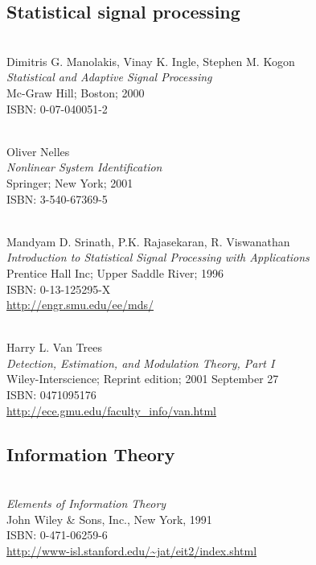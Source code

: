 \begin{thebibliography}{9}
\subsection*{Statistical signal processing}
\hspace{1pt}\\
   Dimitris G. Manolakis, Vinay K. Ingle, Stephen M. Kogon\\ 
   {\em Statistical and Adaptive Signal Processing} \\
   Mc-Graw Hill; Boston; 2000 \\
   ISBN: 0-07-040051-2 

\hspace{1pt}\\
   Oliver Nelles\\ 
   {\em Nonlinear System Identification} \\
   Springer; New York; 2001 \\
   ISBN: 3-540-67369-5 

\hspace{1pt}\\
   Mandyam D. Srinath, P.K. Rajasekaran, R. Viswanathan\\ 
   {\em Introduction to Statistical Signal Processing with Applications} \\
   Prentice Hall Inc; Upper Saddle River; 1996 \\
   ISBN: 0-13-125295-X  \\
   \url{http://engr.smu.edu/ee/mds/}

 \hspace{1pt}\\
   Harry L. Van Trees \\
   {\em Detection, Estimation, and Modulation Theory, Part I } \\
   Wiley-Interscience; Reprint edition; 2001 September 27 \\
   ISBN: 0471095176 \\
   \url{http://ece.gmu.edu/faculty\_info/van.html}

\subsection*{Information Theory}
 \hspace{1pt}\\
  {\em Elements of Information Theory} \\
  John Wiley \& Sons, Inc., New York, 1991 \\
  ISBN: 0-471-06259-6 \\
  \url{http://www-isl.stanford.edu/~jat/eit2/index.shtml}


\end{thebibliography}
